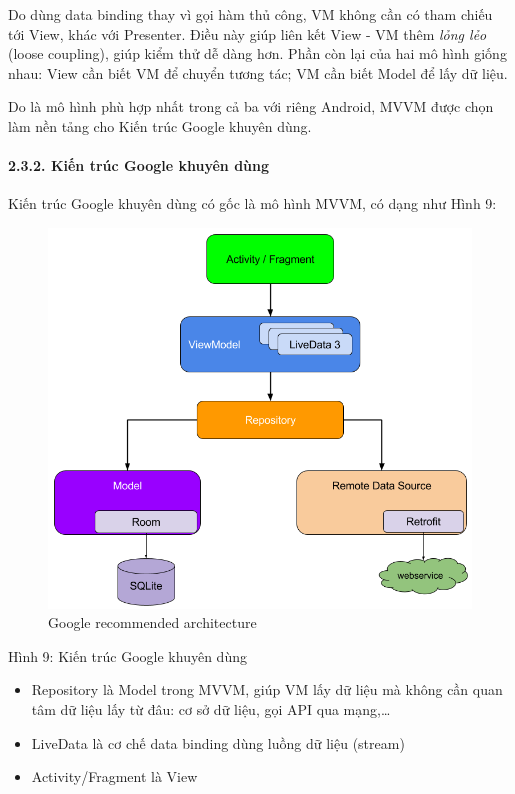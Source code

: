 \documentclass[
]{article}
\providecommand{\tightlist}{%
  \setlength{\itemsep}{0pt}\setlength{\parskip}{0pt}}
\begin{document}
Do dùng data binding thay vì gọi hàm thủ công, VM không cần có tham
chiếu tới View, khác với Presenter. Điều này giúp liên kết View - VM
thêm \emph{lỏng lẻo} (loose coupling), giúp kiểm thử dễ dàng hơn. Phần
còn lại của hai mô hình giống nhau: View cần biết VM để chuyển tương
tác; VM cần biết Model để lấy dữ liệu.

Do là mô hình phù hợp nhất trong cả ba với riêng Android, MVVM được chọn
làm nền tảng cho Kiến trúc Google khuyên dùng.

\hypertarget{kiux1ebfn-truxfac-google-khuyuxean-duxf9ng}{%
\paragraph{\texorpdfstring{2.3.2. Kiến trúc Google khuyên dùng
}{2.3.2. Kiến trúc Google khuyên dùng }}\label{kiux1ebfn-truxfac-google-khuyuxean-duxf9ng}}

Kiến trúc Google khuyên dùng có gốc là mô hình MVVM, có dạng như Hình 9:

\begin{figure}
\centering
\includegraphics{../images/final-architecture.png}
\caption{Google recommended architecture}
\end{figure}

Hình 9: Kiến trúc Google khuyên dùng

\begin{itemize}
\tightlist
\item
  Repository là Model trong MVVM, giúp VM lấy dữ liệu mà không cần quan
  tâm dữ liệu lấy từ đâu: cơ sở dữ liệu, gọi API qua mạng,\ldots{}
\item
  LiveData là cơ chế data binding dùng luồng dữ liệu (stream)
\item
  Activity/Fragment là View
\end{itemize}
\end{document}
